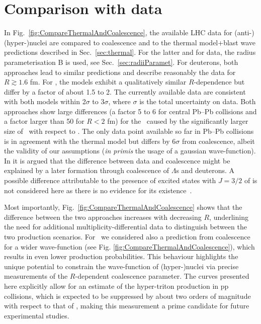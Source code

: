 \section{Comparison with data}
In Fig.~\ref{fig:CompareThermalAndCoalescence}, the available LHC data for (anti-)(hyper-)nuclei \cite{ALICE:nucleipp2017, ALICE:deuteronppPbPb2015, Adam:2015yta}
are compared to coalescence and to the thermal model+blast wave predictions described in Sec.~\ref{sec:thermal}.
For the latter and for data, the radius parameterisation B is used, see Sec.~\ref{sec:radiiParamet}. 
For deuterons, both approaches lead to similar predictions and describe reasonably the data for $R \gtrsim 1.6$ fm. 
For \hethree, the models exhibit a qualitatively similar $R$-dependence but differ by a factor of about 1.5 to 2. 
The currently available data are consistent with both models within 2$\sigma$ to 3$\sigma$, where $\sigma$ is the total uncertainty on data. 
Both approaches show large differences (a factor 5 to 6 for central Pb--Pb collisions and a factor larger than 50 for $R < 2$ fm) for the \hthreelambda\ caused by the significantly larger size of \hthreelambda\ with respect to \hethree. 
The only data point available so far in Pb--Pb collisions is in agreement with the thermal model but differs by 6$\sigma$ from coalescence, albeit the validity of our assumptions (\textit{in primis} the usage of a gaussian wave-function).
In \cite{Zhang:2018euf} it is argued that the difference between data and coalescence might be explained by a later formation through coalescence of $\Lambda$s and deuterons. 
A possible difference attributable to the presence of excited states with $J=3/2$ of \hthreelambda
is not considered here as there is no evidence for its existence~\cite{Mart:1996ay}. 

Most importantly, Fig.~\ref{fig:CompareThermalAndCoalescence} shows that the difference between the two approaches increases with decreasing $R$, underlining the need for additional multiplicity-differential data to distinguish between the two production scenarios. 
For \hthreelambda~we considered also a prediction from coalescence for a wider wave-function (see Fig. \ref{fig:CompareThermalAndCoalescence}), which results in even lower production probabilities. This behaviour highlights the unique potential to constrain the wave-function of (hyper-)nuclei via precise measurements of the $R$-dependent coalescence parameter. 
The curves presented here explicitly allow for an estimate of the hyper-triton production in pp collisions, which is expected to be suppressed by about two orders of magnitude with respect to that of \hethree, making this measurement a prime candidate for future experimental studies.


